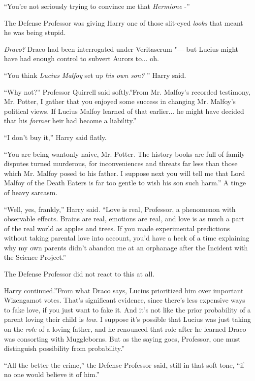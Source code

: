 ``You're not seriously trying to convince me that \emph{Hermione} -''

The Defense Professor was giving Harry one of those slit-eyed
\emph{looks} that meant he was being stupid.

\emph{Draco?} Draco had been interrogated under Veritaserum "--- but Lucius
might have had enough control to subvert Aurors to... oh.

``You think \emph{Lucius Malfoy} set up \emph{his own son?} '' Harry said.

``Why not?'' Professor Quirrell said softly.''From Mr. Malfoy's recorded
testimony, Mr. Potter, I gather that you enjoyed some success in
changing Mr. Malfoy's political views. If Lucius Malfoy learned of that
earlier... he might have decided that his \emph{former} heir had
become a liability.''

``I don't buy it,'' Harry said flatly.

``You are being wantonly naive, Mr. Potter. The history books are full
of family disputes turned murderous, for inconveniences and threats far
less than those which Mr. Malfoy posed to his father. I suppose next you
will tell me that Lord Malfoy of the Death Eaters is far too gentle to
wish his son such harm.'' A tinge of heavy sarcasm.

``Well, yes, frankly,'' Harry said. ``Love is real, Professor, a
phenomenon with observable effects. Brains are real, emotions are real,
and love is as much a part of the real world as apples and trees. If you
made experimental predictions without taking parental love into account,
you'd have a heck of a time explaining why my own parents didn't abandon
me at an orphanage after the Incident with the Science Project.''

The Defense Professor did not react to this at all.

Harry continued.''From what Draco says, Lucius prioritized him over
important Wizengamot votes. That's significant evidence, since there's
less expensive ways to fake love, if you just want to fake it. And it's
not like the prior probability of a parent loving their child is
\emph{low}. I suppose it's possible that Lucius was just taking on the
\emph{role} of a loving father, and he renounced that role after he
learned Draco was consorting with Muggleborns. But as the saying goes,
Professor, one must distinguish possibility from probability.''

``All the better the crime,'' the Defense Professor said, still in that
soft tone, ``if no one would believe it of him.''

